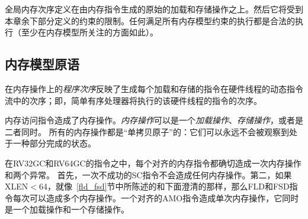 全局内存次序定义在由内存指令生成的原始的加载和存储操作之上。然后它将受到本章余下部分定义的约束的限制。任何满足所有内存模型约束的执行都是合法的执行（至少在内存模型所关注的方面如此）。

\subsection*{内存模型原语}
\label{sec:rvwmo:primitives}
在内存操作上的{\em 程序次序}反映了生成每个加载和存储的指令在硬件线程的动态指令流中的次序；即，简单有序处理器将执行的该硬件线程的指令的次序。

内存访问指令造成了内存操作。{\em 内存操作}可以是一个{\em 加载操作}、{\em 存储操作}，或者是二者同时。
所有的内存操作都是“单拷贝原子”的：它们可以永远不会被观察到处于一种部分完成的状态。

在RV32GC和RV64GC的指令之中，每个对齐的内存指令都确切造成一次内存操作和两个异常。
首先，一次不成功的SC指令不会造成任何内存操作。第二，如果XLEN$<$64，就像~\ref{fld_fsd}节中所陈述的和下面澄清的那样，那么FLD和FSD指令每次可以造成多个内存操作。一个对齐的AMO指令造成单次内存操作，它同时是一个加载操作和一个存储操作。

